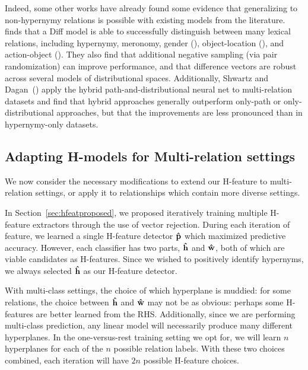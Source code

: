 Indeed, some other works have already found some evidence that generalizing to
non-hypernymy relations is possible with existing models from the literature.
 finds that a Diff model \cite{weeds:2004:coling}
is able to successfully distinguish between many lexical relations,
including hypernymy, meronomy, gender (), object-location
(), and action-object (). They also find that
additional negative sampling (via pair randomization) can improve performance,
and that difference vectors are robust across several models of distributional
spaces.  Additionally, Shwartz and
Dagan~() apply the
hybrid path-and-distributional neural net \cite{shwartz:2016:acl} to
multi-relation datasets and find that hybrid approaches generally outperform
only-path or only-distributional approaches, but that the improvements are less
pronounced than in hypernymy-only datasets.

\subsection{Adapting H-models for Multi-relation settings}

We now consider the necessary modifications to extend our H-feature to
multi-relation settings, or apply it to relationships which contain more
diverse settings.

In Section~\ref{sec:hfeatproposed}, we proposed iteratively training multiple
H-feature extractors through the use of vector rejection. During each iteration
of feature, we learned a single H-feature detector ${\mathbf{\hat p}}$ which maximized
predictive accuracy. However, each classifier has two parts, ${\mathbf{\hat h}}$ and
${\mathbf{\hat w}}$, both of which are viable candidates as H-features. Since we wished to
positively identify hypernyms, we always selected ${\mathbf{\hat h}}$ as our
H-feature detector.

With multi-class settings, the choice of which hyperplane is muddied: for
some relations, the choice between ${\mathbf{\hat h}}$ and ${\mathbf{\hat w}}$ may not be as obvious:
perhaps some H-features are better learned from the RHS. Additionally,
since we are performing multi-class prediction, any linear model will
necessarily produce many different hyperplanes. In the one-versus-rest
training setting we opt for, we will learn $n$ hyperplanes for each of the
$n$ possible relation labels. With these two choices combined, each iteration
will have $2n$ possible H-feature choices.

